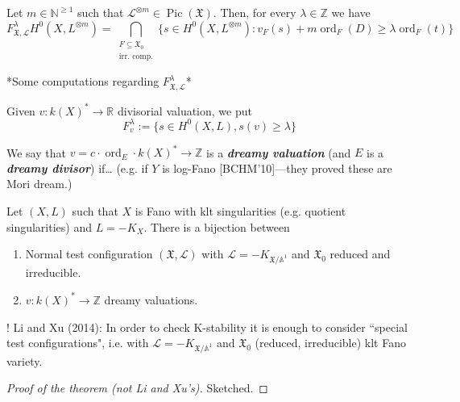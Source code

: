 \begin{prop}\leavevmode
Let \(m \in \mathbb{N}^{\geq 1}\) such that \(\mathcal{L}^{\otimes m} \in \operatorname{Pic}(\mathfrak{X})\). Then, for every \(\lambda \in \mathbb{Z}\) we have
\[F^\lambda_{\mathfrak{X},\mathcal{L}}H^{0}(X,L^{\otimes m})=\bigcap_{\substack{F \subseteq \mathfrak{X}_0 \\ \text{irr. comp.} }}\{s \in H^{0}(X,L^{\otimes m}):v_F(s)+m \operatorname{ord}_F(D) \geq \lambda \operatorname{ord}_F(t)\}\]
\end{prop}

*Some computations regarding \(F^\lambda_{\mathfrak{X},\mathcal{L}}\)*

\begin{defn}\leavevmode
Given \(v: k(X)^* \longrightarrow\mathbb{R}\) divisorial valuation, we put
\[F^\lambda_v:=\{s \in H^{0}(X,L),s(v) \geq \lambda\}\]
\end{defn}

\begin{defn}[K. Fujta '16]\leavevmode
	We say that \(v=c\cdot \operatorname{ord}_E\cdot k(X)^* \longrightarrow \mathbb{Z}\) is a \textit{\textbf{dreamy valuation}} (and \(E\) is a \textit{\textbf{dreamy divisor}}) if… (e.g. if \(Y\) is log-Fano [BCHM'10]---they proved these are Mori dream.)
\end{defn}

\begin{thm}\leavevmode
Let \((X,L)\) such that \(X\) is Fano with klt singularities (e.g. quotient singularities) and \(L=-K_X\). There is a bijection between
\begin{enumerate}
\item Normal test configuration \((\mathfrak{X},\mathcal{L})\) with \(\mathcal{L}=-K_{\mathfrak{X}/\mathbb{A}^1}\) and \(\mathfrak{X}_0\) reduced and irreducible.
\item \(v:k(X)^* \longrightarrow \mathbb{Z}\) dreamy valuations.
\end{enumerate}
\end{thm}

\begin{thing7}{!}\leavevmode
Li and Xu (2014): In order to check K-stability it is enough to consider  ``special test configurations", i.e. with \(\mathcal{L}=-K_{\mathfrak{X}/\mathbb{A}^1}\) and \(\mathfrak{X}_0\) (reduced, irreducible) klt Fano variety.
\end{thing7}

\begin{proof}[Proof of the theorem (not Li and Xu's)]\leavevmode
Sketched.
\end{proof}

